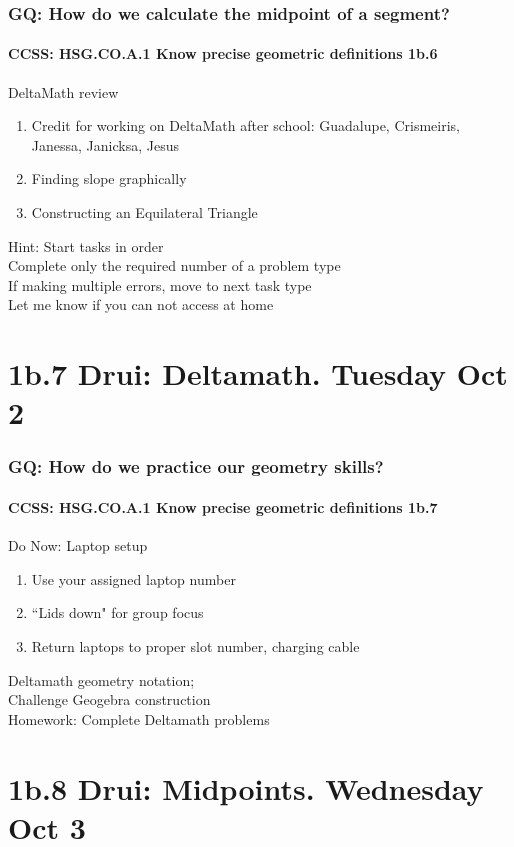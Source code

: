 \documentclass{beamer}
\begin{document}
  \frame
    {
      \frametitle{GQ: How do we calculate the midpoint of a segment?}
      \framesubtitle{CCSS: HSG.CO.A.1 Know precise geometric definitions  \alert{1b.6}}

      \begin{block}{DeltaMath review}
        \begin{enumerate}
            \item Credit for working on DeltaMath after school: Guadalupe, Crismeiris, Janessa, Janicksa, Jesus
            \item Finding slope graphically
            \item Constructing an Equilateral Triangle
        \end{enumerate}
      \end{block}
      Hint: Start tasks in order\\
      Complete only the required number of a problem type\\
      If making multiple errors, move to next task type\\
      \vspace{0.5cm}
      Let me know if you can not access at home
    }

\section{1b.7 Drui: Deltamath. Tuesday Oct 2}
  \frame
  {
    \frametitle{GQ: How do we practice our geometry skills?}
    \framesubtitle{CCSS: HSG.CO.A.1 Know precise geometric definitions  \alert{1b.7}}

    \begin{block}{Do Now: Laptop setup}
    \begin{enumerate}
        \item Use your assigned laptop number
        \item ``Lids down" for group focus
        \item Return laptops to proper slot number, charging cable
    \end{enumerate}
    \end{block}
    Deltamath geometry notation; \\Challenge Geogebra construction\\
    \vspace{1cm}
    Homework: Complete Deltamath problems
  }

\section{1b.8 Drui: Midpoints. Wednesday Oct 3}
\end{document}
